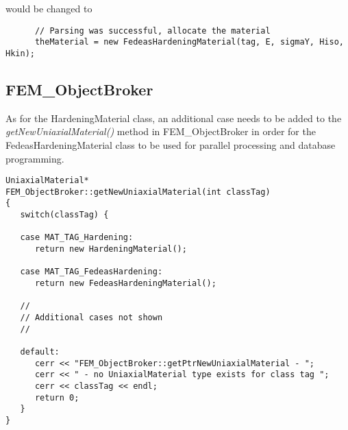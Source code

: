 \documentclass[12pt]{article}
\begin{document}
\noindent would be changed to

{\sf\small
\begin{verbatim}
      // Parsing was successful, allocate the material
      theMaterial = new FedeasHardeningMaterial(tag, E, sigmaY, Hiso, Hkin); 
\end{verbatim}
}

\subsection{FEM\_ObjectBroker}
As for the HardeningMaterial class, an additional case needs to be added to the
{\em getNewUniaxialMaterial()} method in FEM\_ObjectBroker in order for the
FedeasHardeningMaterial class to be used for parallel processing and database
programming.

{\sf\small
\begin{verbatim}
UniaxialMaterial*
FEM_ObjectBroker::getNewUniaxialMaterial(int classTag)
{
   switch(classTag) {

   case MAT_TAG_Hardening:
      return new HardeningMaterial();

   case MAT_TAG_FedeasHardening:
      return new FedeasHardeningMaterial();

   //
   // Additional cases not shown
   //

   default:
      cerr << "FEM_ObjectBroker::getPtrNewUniaxialMaterial - ";
      cerr << " - no UniaxialMaterial type exists for class tag ";
      cerr << classTag << endl;
      return 0;
   }        
}
\end{verbatim}
}
\end{document}
